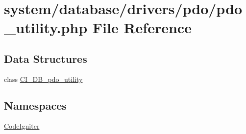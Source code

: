 \hypertarget{pdo__utility_8php}{}\section{system/database/drivers/pdo/pdo\+\_\+utility.php File Reference}
\label{pdo__utility_8php}
\subsection*{Data Structures}
\begin{DoxyCompactItemize}
\item 
class \mbox{\hyperlink{class_c_i___d_b__pdo__utility}{C\+I\+\_\+\+D\+B\+\_\+pdo\+\_\+utility}}
\end{DoxyCompactItemize}
\subsection*{Namespaces}
\begin{DoxyCompactItemize}
\item 
 \mbox{\hyperlink{namespace_code_igniter}{Code\+Igniter}}
\end{DoxyCompactItemize}
